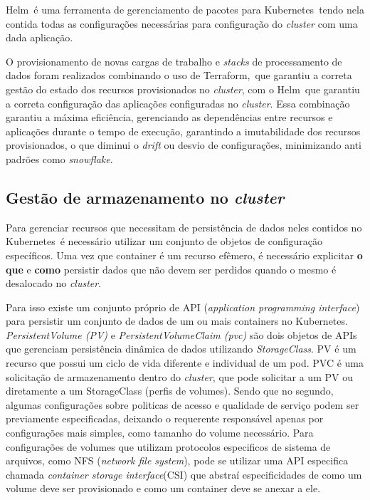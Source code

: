 Helm\textregistered\ é uma ferramenta de gerenciamento de pacotes para Kubernetes\textregistered\, tendo nela contida todas as configurações necessárias para configuração do \emph{cluster} com uma dada aplicação. 

O provisionamento de novas cargas de trabalho e \emph{stacks} de processamento de dados foram realizados combinando o uso de Terraform\textregistered,\ que garantiu a correta gestão do estado dos recursos provisionados no \emph{cluster}, com o Helm\textregistered\, que garantiu a correta configuração das aplicações configuradas no \emph{cluster}. Essa combinação garantiu a máxima eficiência, gerenciando as dependências entre recursos e aplicações durante o tempo de execução, garantindo a imutabilidade dos recursos provisionados, o que diminui o \emph{drift} ou desvio de configurações, minimizando anti padrões como \emph{snowflake}\cite{snowflakeanti}.

\subsection{Gestão de armazenamento no \emph{cluster}}
Para gerenciar recursos que necessitam de persistência de dados neles contidos no Kubernetes\textregistered\ é necessário utilizar um conjunto de objetos de configuração específicos. Uma vez que container é um recurso efêmero, é necessário explicitar \textbf{o que} e \textbf{como} persistir dados que não devem ser perdidos quando o mesmo é desalocado no \emph{cluster}. 

Para isso existe um conjunto próprio de API (\emph{application programming interface}) para persistir um conjunto de dados de um ou mais containers no Kubernetes\textregistered. \emph{PersistentVolume (PV)} e \emph{PersistentVolumeClaim (pvc)} são dois objetos de APIs que gerenciam persistência dinâmica de dados utilizando \emph{StorageClass}. PV é um recurso que possui um ciclo de vida diferente e individual de um pod. PVC é uma solicitação de armazenamento dentro do \emph{cluster}, que pode solicitar a um PV ou diretamente a um StorageClass (perfis de volumes). Sendo que no segundo, algumas configurações sobre politicas de acesso e qualidade de serviço podem ser previamente especificadas, deixando o requerente responsável apenas por configurações mais simples, como tamanho do volume necessário. Para configurações de volumes que utilizam protocolos especificos de sistema de arquivos, como NFS (\emph{network file system}), pode se utilizar uma API especifica chamada \emph{container storage interface}(CSI) que abstraí especificidades de como um volume deve ser provisionado e como um container deve se anexar a ele.

